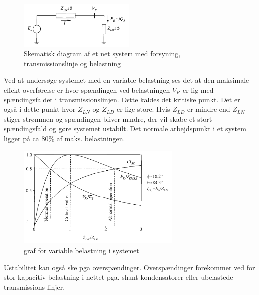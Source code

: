 \begin{figure}[H] %
	\centering
	\includegraphics[width=0.5\textwidth]{figurer/Voltage_system}
	\caption{Skematisk diagram af et net system med forsyning, transmissionslinje og belastning}
	\label{fig:Voltage1}
\end{figure}

Ved at undersøge systemet med en variable belastning ses det at den maksimale effekt overførelse er hvor spændingen ved belastningen $V_{R}$ er lig med spændingsfaldet i transmissionslinjen. Dette kaldes det kritiske punkt. Det er også i dette punkt hvor $Z_{LN}$ og $Z_{LD}$ er lige store. Hvis $Z_{LD}$ er mindre end $Z_{LN}$ stiger strømmen og spændingen bliver mindre, der vil skabe et stort spændingsfald og gøre systemet ustabilt. Det normale arbejdspunkt i et system ligger på ca 80\% af maks. belastningen.

\begin{figure}[H] %
	\centering
	\includegraphics[width=0.7\textwidth]{figurer/Voltage_curve}
	\caption{graf for variable belastning i systemet}
	\label{fig:Voltage2}
\end{figure}

Ustabilitet kan også ske pga overspændinger. Overspændinger forekommer ved for stor kapacitiv belastning i nettet pga. shunt kondensatorer eller ubelastede transmissions linjer.